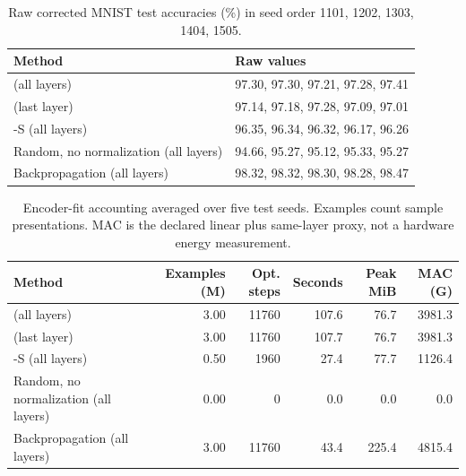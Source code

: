 \begin{table}[H]
\centering
\small
\caption{Raw corrected MNIST test accuracies (\%) in seed order 1101, 1202, 1303, 1404, 1505.}
\label{tab:corrected-raw}
\begin{tabular}{ll}
\toprule
Method & Raw values \\
\midrule
\TeReL{} (all layers) & 97.30, 97.30, 97.21, 97.28, 97.41 \\
\TeReL{} (last layer) & 97.14, 97.18, 97.28, 97.09, 97.01 \\
\TeReL{}-S (all layers) & 96.35, 96.34, 96.32, 96.17, 96.26 \\
Random, no normalization (all layers) & 94.66, 95.27, 95.12, 95.33, 95.27 \\
Backpropagation (all layers) & 98.32, 98.32, 98.30, 98.28, 98.47 \\
\bottomrule
\end{tabular}
\end{table}

\begin{table}[H]
\centering
\small
\caption{Encoder-fit accounting averaged over five test seeds. Examples count sample presentations. MAC is the declared linear plus same-layer proxy, not a hardware energy measurement.}
\label{tab:corrected-resources}
\begin{tabular}{lrrrrr}
\toprule
Method & Examples (M) & Opt. steps & Seconds & Peak MiB & MAC (G) \\
\midrule
\TeReL{} (all layers) & 3.00 & 11760 & 107.6 & 76.7 & 3981.3 \\
\TeReL{} (last layer) & 3.00 & 11760 & 107.7 & 76.7 & 3981.3 \\
\TeReL{}-S (all layers) & 0.50 & 1960 & 27.4 & 77.7 & 1126.4 \\
Random, no normalization (all layers) & 0.00 & 0 & 0.0 & 0.0 & 0.0 \\
Backpropagation (all layers) & 3.00 & 11760 & 43.4 & 225.4 & 4815.4 \\
\bottomrule
\end{tabular}
\end{table}

